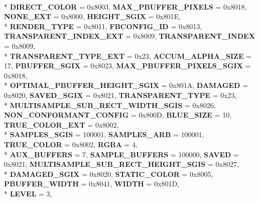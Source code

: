 \begin{DoxyCompactItemize}
\\*
{\bfseries D\-I\-R\-E\-C\-T\-\_\-\-C\-O\-L\-O\-R} = 0x8003, 
{\bfseries M\-A\-X\-\_\-\-P\-B\-U\-F\-F\-E\-R\-\_\-\-P\-I\-X\-E\-L\-S} = 0x8018, 
{\bfseries N\-O\-N\-E\-\_\-\-E\-X\-T} = 0x8000, 
{\bfseries H\-E\-I\-G\-H\-T\-\_\-\-S\-G\-I\-X} = 0x801\-E, 
\\*
{\bfseries R\-E\-N\-D\-E\-R\-\_\-\-T\-Y\-P\-E} = 0x8011, 
{\bfseries F\-B\-C\-O\-N\-F\-I\-G\-\_\-\-I\-D} = 0x8013, 
{\bfseries T\-R\-A\-N\-S\-P\-A\-R\-E\-N\-T\-\_\-\-I\-N\-D\-E\-X\-\_\-\-E\-X\-T} = 0x8009, 
{\bfseries T\-R\-A\-N\-S\-P\-A\-R\-E\-N\-T\-\_\-\-I\-N\-D\-E\-X} = 0x8009, 
\\*
{\bfseries T\-R\-A\-N\-S\-P\-A\-R\-E\-N\-T\-\_\-\-T\-Y\-P\-E\-\_\-\-E\-X\-T} = 0x23, 
{\bfseries A\-C\-C\-U\-M\-\_\-\-A\-L\-P\-H\-A\-\_\-\-S\-I\-Z\-E} = 17, 
{\bfseries P\-B\-U\-F\-F\-E\-R\-\_\-\-S\-G\-I\-X} = 0x8023, 
{\bfseries M\-A\-X\-\_\-\-P\-B\-U\-F\-F\-E\-R\-\_\-\-P\-I\-X\-E\-L\-S\-\_\-\-S\-G\-I\-X} = 0x8018, 
\\*
{\bfseries O\-P\-T\-I\-M\-A\-L\-\_\-\-P\-B\-U\-F\-F\-E\-R\-\_\-\-H\-E\-I\-G\-H\-T\-\_\-\-S\-G\-I\-X} = 0x801\-A, 
{\bfseries D\-A\-M\-A\-G\-E\-D} = 0x8020, 
{\bfseries S\-A\-V\-E\-D\-\_\-\-S\-G\-I\-X} = 0x8021, 
{\bfseries T\-R\-A\-N\-S\-P\-A\-R\-E\-N\-T\-\_\-\-T\-Y\-P\-E} = 0x23, 
\\*
{\bfseries M\-U\-L\-T\-I\-S\-A\-M\-P\-L\-E\-\_\-\-S\-U\-B\-\_\-\-R\-E\-C\-T\-\_\-\-W\-I\-D\-T\-H\-\_\-\-S\-G\-I\-S} = 0x8026, 
{\bfseries N\-O\-N\-\_\-\-C\-O\-N\-F\-O\-R\-M\-A\-N\-T\-\_\-\-C\-O\-N\-F\-I\-G} = 0x800\-D, 
{\bfseries B\-L\-U\-E\-\_\-\-S\-I\-Z\-E} = 10, 
{\bfseries T\-R\-U\-E\-\_\-\-C\-O\-L\-O\-R\-\_\-\-E\-X\-T} = 0x8002, 
\\*
{\bfseries S\-A\-M\-P\-L\-E\-S\-\_\-\-S\-G\-I\-S} = 100001, 
{\bfseries S\-A\-M\-P\-L\-E\-S\-\_\-\-A\-R\-B} = 100001, 
{\bfseries T\-R\-U\-E\-\_\-\-C\-O\-L\-O\-R} = 0x8002, 
{\bfseries R\-G\-B\-A} = 4, 
\\*
{\bfseries A\-U\-X\-\_\-\-B\-U\-F\-F\-E\-R\-S} = 7, 
{\bfseries S\-A\-M\-P\-L\-E\-\_\-\-B\-U\-F\-F\-E\-R\-S} = 100000, 
{\bfseries S\-A\-V\-E\-D} = 0x8021, 
{\bfseries M\-U\-L\-T\-I\-S\-A\-M\-P\-L\-E\-\_\-\-S\-U\-B\-\_\-\-R\-E\-C\-T\-\_\-\-H\-E\-I\-G\-H\-T\-\_\-\-S\-G\-I\-S} = 0x8027, 
\\*
{\bfseries D\-A\-M\-A\-G\-E\-D\-\_\-\-S\-G\-I\-X} = 0x8020, 
{\bfseries S\-T\-A\-T\-I\-C\-\_\-\-C\-O\-L\-O\-R} = 0x8005, 
{\bfseries P\-B\-U\-F\-F\-E\-R\-\_\-\-W\-I\-D\-T\-H} = 0x8041, 
{\bfseries W\-I\-D\-T\-H} = 0x801\-D, 
\\*
{\bfseries L\-E\-V\-E\-L} = 3, 

\end{DoxyCompactItemize}
